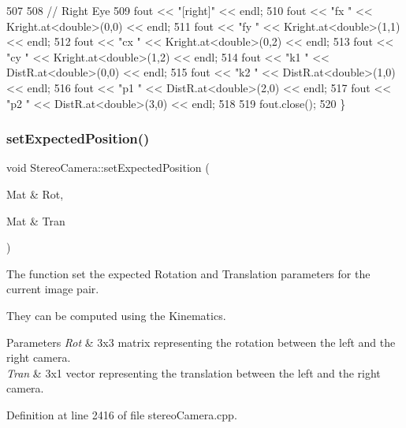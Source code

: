 \begin{DoxyCode}
507 
508     \textcolor{comment}{// Right Eye}
509     fout << \textcolor{stringliteral}{"[right]"} << endl;
510     fout << \textcolor{stringliteral}{"fx "} << Kright.at<\textcolor{keywordtype}{double}>(0,0) << endl;
511     fout << \textcolor{stringliteral}{"fy "} << Kright.at<\textcolor{keywordtype}{double}>(1,1) << endl;
512     fout << \textcolor{stringliteral}{"cx "} << Kright.at<\textcolor{keywordtype}{double}>(0,2) << endl;
513     fout << \textcolor{stringliteral}{"cy "} << Kright.at<\textcolor{keywordtype}{double}>(1,2) << endl;
514     fout << \textcolor{stringliteral}{"k1 "} << DistR.at<\textcolor{keywordtype}{double}>(0,0) << endl;
515     fout << \textcolor{stringliteral}{"k2 "} << DistR.at<\textcolor{keywordtype}{double}>(1,0) << endl;
516     fout << \textcolor{stringliteral}{"p1 "} << DistR.at<\textcolor{keywordtype}{double}>(2,0) << endl;
517     fout << \textcolor{stringliteral}{"p2 "} << DistR.at<\textcolor{keywordtype}{double}>(3,0) << endl;
518 
519     fout.close();
520 \}
\end{DoxyCode}
\mbox{\label{classStereoCamera_a9ecb303d7b36eaf5f086d8ddebd29b95}} 
\subsubsection{\texorpdfstring{set\+Expected\+Position()}{setExpectedPosition()}}
{\footnotesize\ttfamily void Stereo\+Camera\+::set\+Expected\+Position (\begin{DoxyParamCaption}\item[{Mat \&}]{Rot,  }\item[{Mat \&}]{Tran }\end{DoxyParamCaption})}



The function set the expected Rotation and Translation parameters for the current image pair. 

They can be computed using the Kinematics. 
\begin{DoxyParams}{Parameters}
{\em Rot} & 3x3 matrix representing the rotation between the left and the right camera. \\
\hline
{\em Tran} & 3x1 vector representing the translation between the left and the right camera. \\
\hline
\end{DoxyParams}


Definition at line 2416 of file stereo\+Camera.\+cpp.


